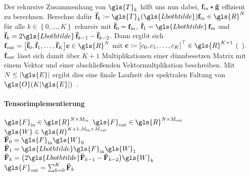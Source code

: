 Der rekursive Zusammenhang von $\gls{T}_k$ hilft uns nun dabei, $\mathbf{f}_{\mathrm{in}} \star \mathbf{\hat g}$ effizient zu berechnen.
Berechne dafür $\ve{\bar f}_k \coloneqq \gls{T}_k\left(\gls{Lbothtilde}\right)\ve{f}_{\mathrm{in}} \in \gls{R}^N$ für alle $k \in \left\lbrace0, \ldots, K\right\rbrace$ rekursiv mit $\mathbf{\bar f}_0 = \mathbf{f}_{\mathrm{in}}$, $\ve{\bar f}_1 = \gls{Lbothtilde}\,\ve{f}_{\mathrm{in}}$ und $\ve{\bar f}_k = 2 \gls{Lbothtilde}\,\ve{\bar f}_{k-1} - \ve{\bar f}_{k - 2}$.
Dann ergibt sich $\ve{f}_{\mathrm{out}} = \left[\ve{\bar f}_0, \ve{\bar f}_1, \ldots, \ve{\bar f}_K\right]\ve{c} \in \gls{R}^N$ mit $\ve{c} \coloneqq {\left[c_0, c_1, \ldots, c_K\right]}^{\top} \in \gls{R}^{K+1}$ (\vgl{}~\cite{Hammond}).
$\mathbf{f}_{\mathrm{out}}$ lässt sich damit über $K + 1$ Multiplikationen einer dünnbesetzen Matrix mit einem Vektor und einer abschließenden Vektormultplikation beschreiben.
Mit $N \leq \left|\gls{E}\right|$ ergibt dies eine finale Laufzeit der spektralen Faltung von $\gls{O}\left(K\left|\gls{E}\right|\right)$~\cite{Defferrard}.

\paragraph{Tensorimplementierung}
\label{tschebyschow_tensor}

$\gls{F}_{\mathrm{in}} \in \gls{R}^{N \times M_{\mathrm{in}}}$
$\gls{F}_{\mathrm{out}} \in \gls{R}^{N \times M_{\mathrm{out}}}$
$\gls{W} \in \gls{R}^{K+1, M_{\mathrm{in}} \times M_{\mathrm{out}}}$\\

$\ma{\bar F}_0 = \gls{F}_{\mathrm{in}}\gls{W}_0$\\
$\ma{\bar F}_1 = \gls{Lbothtilde}\gls{F}_{\mathrm{in}}\gls{W}_1$\\
$\ma{\bar F}_k = \left(2\gls{Lbothtilde}\ma{\bar F}_{k -1} -  \ma{\bar F}_{k - 2}\right)\gls{W}_k$\\
$\gls{F}_{\mathrm{out}} = \sum_{k=0}^K \ma{\bar F}_k$


